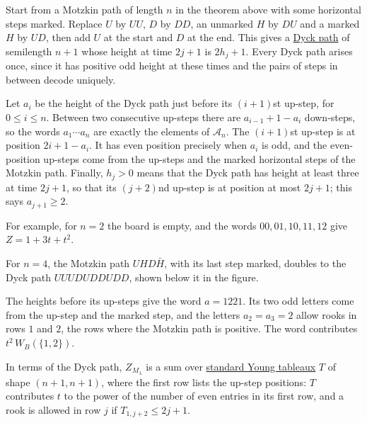 \begin{proof*}
Start from a Motzkin path of length $n$ in the theorem above with some
horizontal steps marked.  Replace $U$ by $UU$, $D$ by $DD$, an unmarked $H$ by
$DU$ and a marked $H$ by $UD$, then add $U$ at the start and $D$ at the end.
This gives a \hyperref[qtCatalan]{Dyck path} of semilength $n+1$ whose height
at time $2j+1$ is $2h_j+1$.  Every Dyck path arises once, since it has
positive odd height at these times and the pairs of steps in between decode
uniquely.

Let $a_i$ be the height of the Dyck path just before its $(i+1)$st up-step,
for $0\leq i\leq n$.  Between two consecutive up-steps there are
$a_{i-1}+1-a_i$ down-steps, so the words $a_1\dotsm a_n$ are exactly the
elements of $\mathcal{A}_n$.  The $(i+1)$st up-step is at position $2i+1-a_i$.
It has even position precisely when $a_i$ is odd, and the even-position
up-steps come from the up-steps and the marked horizontal steps of the Motzkin
path.  Finally, $h_j>0$ means that the Dyck path has height at least three at
time $2j+1$, so that its $(j+2)$nd up-step is at position at most $2j+1$; this
says $a_{j+1}\geq2$.
\end{proof*}

For example, for $n=2$ the board is empty, and the words $00,01,10,11,12$ give
$Z=1+3t+t^2$.

\begin{example*}
For $n=4$, the Motzkin path $UHD\bar{H}$, with its last step marked, doubles to
the Dyck path $UUUDUDDUDD$, shown below it in the figure.
\begin{figure}
\end{figure}

The heights before its up-steps give the word
$a=1221$.  Its two odd letters come from the up-step and the marked step, and
the letters $a_2=a_3=2$ allow rooks in rows $1$ and $2$, the rows where the
Motzkin path is positive.  The word contributes $t^2\,W_B(\{1,2\})$.
\end{example*}

In terms of the Dyck path, $Z_{M_\lambda}$ is a sum over
\hyperref[standardYoungTableau]{standard Young tableaux} $T$ of shape
$(n+1,n+1)$, where the first row lists the up-step positions:
$T$ contributes $t$ to the power of the number of even entries in its first
row, and a rook is allowed in row $j$ if $T_{1,j+2}\leq 2j+1$.

